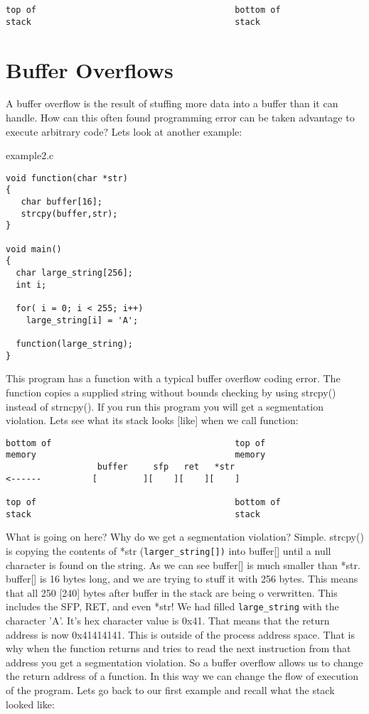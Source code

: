 \documentclass[10pt]{article}
\begin{document}
\begin{CJK}{UTF8}{bsmi}
{\begin{verbatim}
top of                                       bottom of
stack                                        stack
\end{verbatim}
}
\section{Buffer Overflows}

A buffer overflow is the result of stuffing more data into a buffer than it can handle. How can this often found 
programming error can be taken advantage to execute arbitrary code? Lets look at another example:

example2.c 

\begin{lstlisting}
void function(char *str) 
{
   char buffer[16];
   strcpy(buffer,str);
}

void main() 
{
  char large_string[256];
  int i;

  for( i = 0; i < 255; i++)
    large_string[i] = 'A';

  function(large_string);
}
\end{lstlisting}

This program has a function with a typical buffer overflow coding error. The function copies a supplied string 
without bounds checking by using strcpy() instead of strncpy(). If you run this program you will get a segmentation violation. Lets see what its stack looks [like] when we call function: 

{\small
\begin{verbatim}
bottom of                                    top of
memory                                       memory
                  buffer     sfp   ret   *str
<------          [         ][    ][    ][    ]

top of                                       bottom of
stack                                        stack
\end{verbatim}
}
What is going on here? Why do we get a segmentation violation? Simple. strcpy() is copying the contents of  
*str (\verb+larger_string[])+ into buffer[] until a null character  is found on the string. As we can see buffer[] is much 
smaller than *str. buffer[] is 16 bytes long, and we are trying to stuff it with 256 bytes. This means that all 250 
[240] bytes after buffer in the stack are being o verwritten. This includes the SFP, RET, and even *str! We had 
filled \verb+large_string+ with the character 'A'. It's hex character value is 0x41. That means that the return 
address is now 0x41414141. This is outside of the process address space.  That is why when the function returns 
and tries to read the next instruction from that address you get a segmentation violation. So a buffer overflow 
allows us to change the return address of a function. In this way we can change the flow of execution of the 
program. Lets go back to our first example and recall what the stack looked like: 


\end{CJK}
\end{document}
